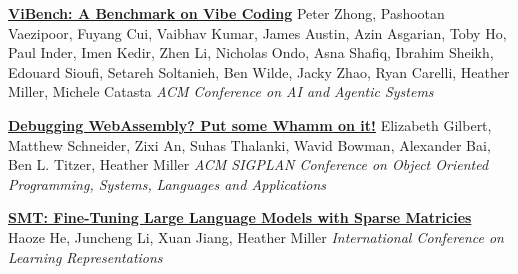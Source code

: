 \documentclass[9pt]{article}
\begin{document}
\bigskip

\noindent\href{https://www.caisconf.org/program/2026/papers/vibench-a-benchmark-on-vibe-coding/}{\bf ViBench: A Benchmark on Vibe Coding}
\newline\noindent Peter Zhong, Pashootan Vaezipoor, Fuyang Cui, Vaibhav Kumar,\vspace{-0.03in}
\newline\noindent James Austin, Azin Asgarian, Toby Ho, Paul Inder, Imen Kedir, Zhen Li,\vspace{-0.03in}
\newline\noindent Nicholas Ondo, Asna Shafiq, Ibrahim Sheikh, Edouard Sioufi, Setareh Soltanieh,\vspace{-0.03in}
\newline\noindent Ben Wilde, Jacky Zhao, Ryan Carelli, Heather Miller, Michele Catasta
\newline\noindent\emph{ACM Conference on AI and Agentic Systems}
\bigskip

\newpage

\noindent\href{https://www.arxiv.org/abs/2504.20192}{\bf Debugging WebAssembly? Put some Whamm on it!}
\newline\noindent Elizabeth Gilbert, Matthew Schneider, Zixi An, Suhas Thalanki,\vspace{-0.03in}  
\newline\noindent Wavid Bowman, Alexander Bai, Ben L. Titzer, Heather Miller
\newline\noindent\emph{ACM SIGPLAN Conference on Object Oriented Programming, Systems,}\vspace{-0.03in} 
\newline\noindent\emph{Languages and Applications}\vspace{-0.03in} 
\bigskip


\noindent\href{https://openreview.net/forum?id=GbgCRJedQ7}{\bf SMT: Fine-Tuning Large Language Models with Sparse Matricies}\vspace{-0.03in}
\newline\noindent Haoze He, Juncheng Li, Xuan Jiang, Heather Miller
\newline\noindent\emph{International Conference on Learning Representations}
\bigskip
\end{document}
